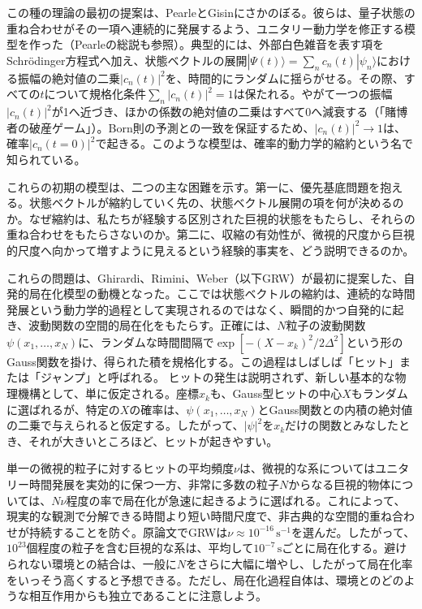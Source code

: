 この種の理論の最初の提案は、Pearle\cite{ref446,ref447,ref448}とGisin\cite{ref194}にさかのぼる。彼らは、量子状態の重ね合わせがその一項へ連続的に発展するよう、ユニタリー動力学を修正する模型を作った（Pearleの総説\cite{ref449}も参照）。典型的には、外部白色雑音を表す項をSchrödinger方程式へ加え、状態ベクトルの展開$|\Psi(t)\rangle=\sum_n c_n(t)|\psi_n\rangle$における振幅の絶対値の二乗$|c_n(t)|^2$を、時間的にランダムに揺らがせる。その際、すべての$t$について規格化条件$\sum_n|c_n(t)|^2=1$は保たれる。やがて一つの振幅$|c_n(t)|^2$が1へ近づき、ほかの係数の絶対値の二乗はすべて0へ減衰する（「賭博者の破産ゲーム」）。Born則の予測との一致を保証するため、$|c_n(t)|^2\to1$は、確率$|c_n(t=0)|^2$で起きる。このような模型は、確率的動力学的縮約という名で知られている。

これらの初期の模型は、二つの主な困難を示す。第一に、優先基底問題を抱える。状態ベクトルが縮約していく先の、状態ベクトル展開の項を何が決めるのか。なぜ縮約は、私たちが経験する区別された巨視的状態をもたらし、それらの重ね合わせをもたらさないのか。第二に、収縮の有効性が、微視的尺度から巨視的尺度へ向かって増すように見えるという経験的事実を、どう説明できるのか。

これらの問題は、Ghirardi、Rimini、Weber（以下GRW）\cite{ref450}が最初に提案した、自発的局在化模型の動機となった。ここでは状態ベクトルの縮約は、連続的な時間発展という動力学的過程として実現されるのではなく、瞬間的かつ自発的に起き、波動関数の空間的局在化をもたらす。正確には、$N$粒子の波動関数$\psi(x_1,\ldots,x_N)$に、ランダムな時間間隔で$\exp[-(X-x_k)^2/2\Delta^2]$という形のGauss関数を掛け、得られた積を規格化する。この過程はしばしば「ヒット」または「ジャンプ」と呼ばれる。
\hypertarget{srcpage:349}{}\label{srcpage:349}
ヒットの発生は説明されず、新しい基本的な物理機構として、単に仮定される。座標$x_k$も、Gauss型ヒットの中心$X$もランダムに選ばれるが、特定の$X$の確率は、$\psi(x_1,\ldots,x_N)$とGauss関数との内積の絶対値の二乗で与えられると仮定する。したがって、$|\psi|^2$を$x_k$だけの関数とみなしたとき、それが大きいところほど、ヒットが起きやすい。

単一の微視的粒子に対するヒットの平均頻度$\nu$は、微視的な系についてはユニタリー時間発展を実効的に保つ一方、非常に多数の粒子$N$からなる巨視的物体については、$N\nu$程度の率で局在化が急速に起きるように選ばれる。これによって、現実的な観測で分解できる時間より短い時間尺度で、非古典的な空間的重ね合わせが持続することを防ぐ。原論文\cite{ref450}でGRWは$\nu\approx10^{-16}\,\mathrm{s}^{-1}$を選んだ。したがって、$10^{23}$個程度の粒子を含む巨視的な系は、平均して$10^{-7}\,\mathrm s$ごとに局在化する。避けられない環境との結合は、一般に$N$をさらに大幅に増やし、したがって局在化率をいっそう高くすると予想できる。ただし、局在化過程自体は、環境とのどのような相互作用からも独立であることに注意しよう。

